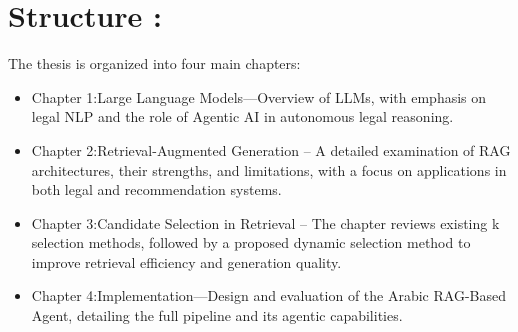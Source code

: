 \section*{Structure :} 
The thesis is organized into four main chapters: 
\begin{itemize}
	\item Chapter 1:Large Language Models—Overview of LLMs, with emphasis on legal NLP and the role of Agentic AI in autonomous legal reasoning.
	
	\item Chapter 2:Retrieval-Augmented Generation – A detailed examination of RAG architectures, their strengths, and limitations, with a focus on applications in both legal and recommendation systems.
	
	\item Chapter 3:Candidate Selection in Retrieval – The chapter reviews existing k selection methods, followed by a proposed dynamic selection method to improve retrieval efficiency and generation quality.

	\item Chapter 4:Implementation—Design and evaluation of the Arabic RAG-Based Agent, detailing the full pipeline and its agentic capabilities.
\end{itemize}
